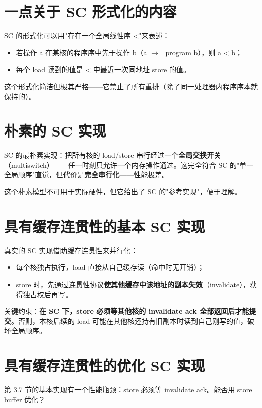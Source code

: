 \section{一点关于 SC 形式化的内容}

SC 的形式化可以用"存在一个全局线性序 <"来表述：

\begin{itemize}
\item 若操作 a 在某核的程序序中先于操作 b（a $\rightarrow$\_program b），则 a < b；
\item 每个 load 读到的值是 < 中最近一次同地址 store 的值。
\end{itemize}


这个形式化简洁但极其严格——它禁止了所有重排（除了同一处理器内程序序本就保持的）。

\section{朴素的 SC 实现}

SC 的最朴素实现：把所有核的 load/store 串行经过一个\textbf{全局交换开关}（multiswitch）——任一时刻只允许一个内存操作通过。这完全符合 SC 的"单一全局顺序"直觉，但代价是\textbf{完全串行化}——性能极差。

这个朴素模型不可用于实际硬件，但它给出了 SC 的"参考实现"，便于理解。

\section{具有缓存连贯性的基本 SC 实现}

真实的 SC 实现借助缓存连贯性来并行化：

\begin{itemize}
\item 每个核独占执行，load 直接从自己缓存读（命中时无开销）；
\item store 时，先通过连贯性协议\textbf{使其他缓存中该地址的副本失效}（invalidate），获得独占权后再写。
\end{itemize}


关键约束：\textbf{在 SC 下，store 必须等其他核的 invalidate ack 全部返回后才能提交}。否则，本核后续的 load 可能在其他核还持有旧副本时读到自己刚写的值，破坏全局顺序。

\section{具有缓存连贯性的优化 SC 实现}

第 3.7 节的基本实现有一个性能瓶颈：store 必须等 invalidate ack。能否用 store buffer 优化？

